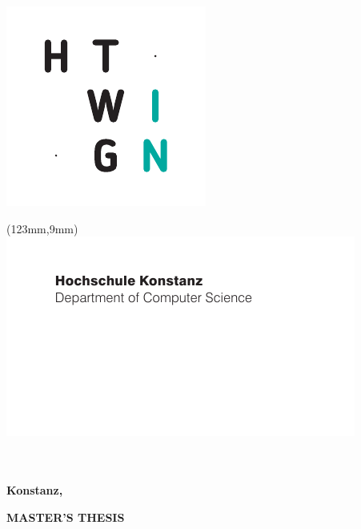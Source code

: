
\begin{titlepage}

\vspace*{-3.5cm}

\begin{flushleft}
\hspace*{-1cm} \includegraphics{htwg/htwg_in_pos_2}
\end{flushleft}


\begin{textblock*}{288mm}(123mm,9mm)
\includegraphics[]{htwg/htwg_in_pos_1}
\end{textblock*}


\vspace{2.0cm}

\begin{center}
	\huge{
		\textbf{\thema} \\[5cm]
	}
	\Large{
		\textbf{\autor}} \\[5.5cm]
	\large{
		\textbf{Konstanz, \abgabedatum} \\[2.3cm]
	}
	
	\Huge{
		\textbf{MASTER'S THESIS}
	}
\end{center}

\end{titlepage}
